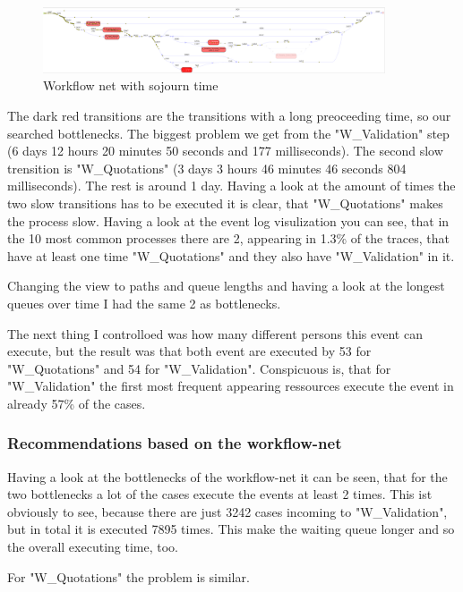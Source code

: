 \begin{figure}[!htbp]
\centering
\includegraphics[width = 0.9\textwidth]{WorkSojuComp.PNG}
\caption{Workflow net with sojourn time}
\label{fig: WorkSojuComp}
\end{figure}

The dark red transitions are the transitions with a long preoceeding time, so our searched bottlenecks. The biggest problem we get from the "W\_Validation" step (6 days 12 hours 20 minutes 50 seconds and 177 milliseconds). The second slow trensition is "W\_Quotations" (3 days 3 hours 46 minutes 46 seconds 804 milliseconds). The rest is around 1 day. Having a look at the amount of times the two slow transitions has to be executed it is clear, that "W\_Quotations" makes the process slow. Having a look at the event log visulization you can see, that in the 10 most common processes there are 2, appearing in 1.3\% of the traces, that have at least one time  "W\_Quotations" and they also have "W\_Validation" in it. 

Changing the view to paths and queue lengths and having a look at the longest queues over time I had the same 2 as bottlenecks.

The next thing I controlloed was how many different persons this event can execute, but the result was that both event are executed by 53 for "W\_Quotations" and 54 for "W\_Validation". Conspicuous is, that for "W\_Validation" the first most frequent appearing ressources execute the event in already 57\% of the cases.

\subsubsection{Recommendations based on the workflow-net}

Having a look at the bottlenecks of the workflow-net it can be seen, that for the two bottlenecks a lot of the cases execute the events at least 2 times. This ist obviously to see, because there are just 3242 cases incoming to "W\_Validation", but in total it is executed 7895 times. This make the waiting queue longer and so the overall executing time, too. 

For "W\_Quotations" the problem is similar.

